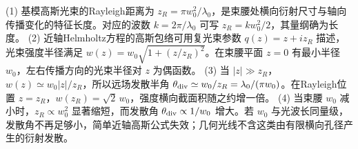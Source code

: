 (1) 基模高斯光束的Rayleigh距离为 \(z_R=\pi w_0^2/\lambda_0\)，是束腰处横向衍射尺寸与轴向传播变化的特征长度。对应的波数 \(k=2\pi/\lambda_0\) 可写 \(z_R=kw_0^2/2\)，其量纲确为长度。
(2) 近轴Helmholtz方程的高斯包络可用复光束参数 \(q(z)=z+iz_R\) 描述，光束强度半径满足 \(w(z)=w_0\sqrt{1+(z/z_R)^2}\)。在束腰平面 \(z=0\) 有最小半径 \(w_0\)，左右传播方向的光束半径对 \(z\) 为偶函数。
(3) 当 \(|z|\gg z_R\)，\(w(z)\simeq w_0|z|/z_R\)，所以远场发散半角 \(\theta_{\rm div}\simeq w_0/z_R=\lambda_0/(\pi w_0)\)。在Rayleigh位置 \(z=z_R\)，\(w(z_R)=\sqrt2\,w_0\)，强度横向截面积随之约增一倍。
(4) 当束腰 \(w_0\) 减小时，\(z_R\propto w_0^2\) 显著缩短，而发散角 \(\theta_{\rm div}\propto1/w_0\) 增大。若 \(w_0\) 与光波长同量级，发散角不再足够小，简单近轴高斯公式失效；几何光线不含这类由有限横向孔径产生的衍射发散。
